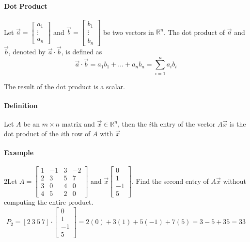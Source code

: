\paragraph*{Dot Product}
Let $\vec{a} = \begin{bmatrix}
    a_1 \\
    \vdots \\
    a_n
\end{bmatrix}$ and $\vec{b} = \begin{bmatrix}
    b_1 \\
    \vdots \\
    b_n
\end{bmatrix}$ be two vectors in $\mathbb{R}^n$. The dot product of $\vec{a}$ and $\vec{b}$, denoted by $\vec{a} \cdot \vec{b}$, is defined as
\[\vec{a} \cdot \vec{b} = a_1b_1 + \ldots + a_nb_n = \sum_{i=1}^n a_ib_i\]

The result of the dot product is a scalar.

\paragraph*{Definition}
Let $A$ be an $m \times n$ matrix and $\vec{x} \in \mathbb{R}^n$, then the $i$th entry of the vector $A\vec{x}$ is 
the dot product of the $i$th row of $A$ with $\vec{x}$

\paragraph*{Example} 2Let $A = \begin{bmatrix}
    1 & -1 & 3 & -2 \\
    2 & 3 & 5 & 7 \\
    3 & 0 & 4 & 0 \\
    4 & 5 & 2 & 0
\end{bmatrix}$ and $\vec{x} \begin{bmatrix} 0 \\ 1 \\ -1 \\ 5 \end{bmatrix}$. Find the second entry of $A\vec{x}$ without computing the entire product.
\[
P_2 = [2 \ 3 \ 5 \ 7] \cdot \begin{bmatrix} 0 \\ 1 \\ -1 \\ 5 \end{bmatrix} = 2(0) + 3(1) + 5(-1) + 7(5) = 3 - 5 + 35 = 33
\]

